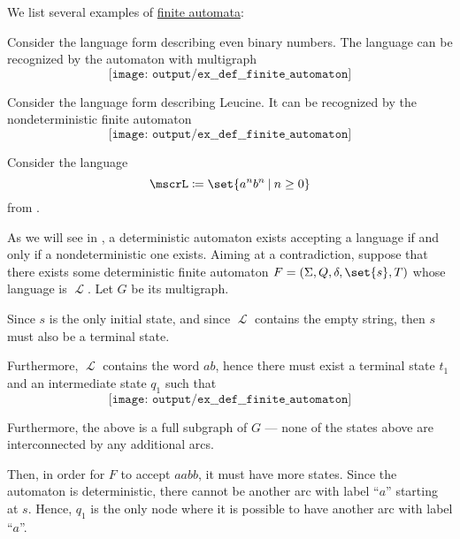 \begin{example}\label{ex:def:finite_automaton}
  We list several examples of \hyperref[def:finite_automaton]{finite automata}:
  \begin{thmenum}
     Consider the language form  describing even binary numbers. The language can be recognized by the automaton with multigraph
    \begin{equation*}
      \texttt{[image: output/ex\_\_def\_\_finite\_automaton]}
    \end{equation*}

     Consider the language form  describing Leucine. It can be recognized by the nondeterministic finite automaton
    \begin{equation*}
      \texttt{[image: output/ex\_\_def\_\_finite\_automaton]}
    \end{equation*}

     Consider the language
    \begin{equation*}
      \mscrL \coloneqq \set{ a^n b^n \given n \geq 0 }
    \end{equation*}
    from .

    As we will see in , a deterministic automaton exists accepting a language if and only if a nondeterministic one exists. Aiming at a contradiction, suppose that there exists some deterministic finite automaton \( F = (\Sigma, Q, \delta, \set{ s }, T) \) whose language is \( \mscrL \). Let \( G \) be its multigraph.

    Since \( s \) is the only initial state, and since \( \mscrL \) contains the empty string, then \( s \) must also be a terminal state.

    Furthermore, \( \mscrL \) contains the word \( ab \), hence there must exist a terminal state \( t_1 \) and an intermediate state \( q_1 \) such that
    \begin{equation*}
      \texttt{[image: output/ex\_\_def\_\_finite\_automaton]}
    \end{equation*}

    Furthermore, the above is a full subgraph of \( G \) --- none of the states above are interconnected by any additional arcs.

    Then, in order for \( F \) to accept \( aabb \), it must have more states. Since the automaton is deterministic, there cannot be another arc with label \enquote{\( a \)} starting at \( s \). Hence, \( q_1 \) is the only node where it is possible to have another arc with label \enquote{\( a \)}.


\end{thmenum}
\end{example}
